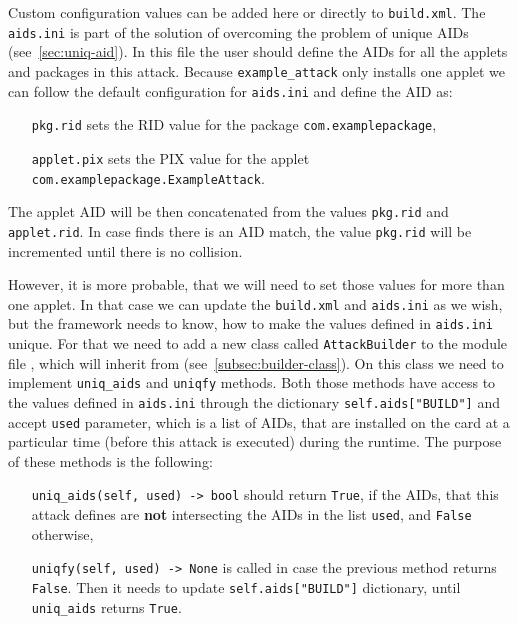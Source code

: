                 Custom configuration values can be added here or directly to \texttt{build.xml}. The \texttt{aids.ini} is part of the solution of overcoming the problem of unique AIDs (see~\ref{sec:uniq-aid}). In this file the user should define the AIDs for all the applets and packages in this attack. Because \texttt{example_attack} only installs one applet we can follow the default configuration for \texttt{aids.ini} and define the AID as:
                \begin{enumerate}[align=left]
                    \item[\texttt{pkg.rid}] sets the RID value for the package \texttt{com.examplepackage},
                    \item[\texttt{applet.pix}] sets the PIX value for the applet \texttt{com.examplepackage.ExampleAttack}.
                \end{enumerate}

                The applet AID will be then concatenated from the values \texttt{pkg.rid} and \texttt{applet.rid}. In case \javus finds there is an AID match, the value \texttt{pkg.rid} will be incremented until there is no collision.

                However, it is more probable, that we will need to set those values for more than one applet. In that case we can update the \texttt{build.xml} and \texttt{aids.ini} as we wish, but the framework needs to know, how to make the values defined in \texttt{aids.ini} unique. For that we need to add a new class called \texttt{AttackBuilder} to the module file \examplemodule, which will inherit from \shortbuilderclass (see~\ref{subsec:builder-class}). On this class we need to implement \texttt{uniq_aids} and \texttt{uniqfy} methods. Both those methods have access to the values defined in \texttt{aids.ini} through the dictionary \texttt{self.aids["BUILD"]} and accept \texttt{used} parameter, which is a list of AIDs, that are installed on the card at a particular time (before this attack is executed) during the runtime. The purpose of these methods is the following:
                \begin{enumerate}[align=left]
                    \item[\texttt{uniq_aids(self, used) -> bool}] should return \texttt{True}, if the AIDs, that this attack defines are \textbf{not} intersecting the AIDs in the list \texttt{used}, and \texttt{False} otherwise,
                    \item[\texttt{uniqfy(self, used) -> None}] is called in case the previous method returns \texttt{False}. Then it needs to update \texttt{self.aids["BUILD"]} dictionary, until \texttt{uniq_aids} returns \texttt{True}.
                \end{enumerate}

